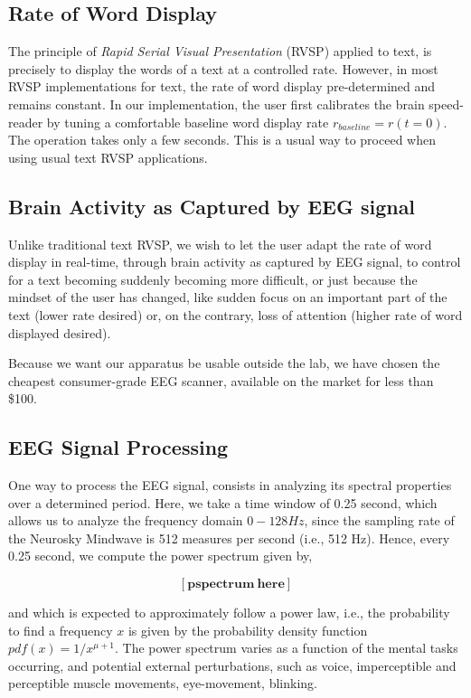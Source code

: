 \subsection{Rate of Word Display}
The principle of {\it Rapid Serial Visual Presentation} (RVSP) applied to text, is precisely to display the words of a text at a controlled rate. However, in most RVSP implementations for text, the rate of word display pre-determined and remains constant. In our implementation, the user first calibrates the brain speed-reader by tuning a comfortable baseline word display rate $r_{baseline} = r(t = 0)$. The operation takes only a few seconds. This is a usual way to proceed when using usual text RVSP applications.

\subsection{Brain Activity as Captured by EEG signal}
Unlike traditional text RVSP, we wish to let the user adapt the rate of word display in real-time, through brain activity as captured by EEG signal, to control for a text becoming suddenly becoming more difficult, or just because the mindset of the user has changed, like sudden focus on an important part of the text (lower rate desired) or, on the contrary, loss of attention (higher rate of word displayed desired).

Because we want our apparatus be usable outside the lab, we have chosen the cheapest consumer-grade EEG scanner, available on the market for less than \$100.

\subsection{EEG Signal Processing}
One way to process the EEG signal, consists in analyzing its spectral properties over a determined period. Here, we take a time window of 0.25 second, which allows us to analyze the frequency domain $0-128Hz$, since the sampling rate of the Neurosky Mindwave is 512 measures per second (i.e., 512 Hz). Hence, every 0.25 second, we compute the power spectrum given by, 

 \begin{equation}
\label{eq:pspectrum}
\mathbf{[pspectrum~here]}
\end{equation}
 
and which is expected to approximately follow a power law, i.e., the probability to find a frequency $x$ is given by the probability density function $pdf(x)  = 1/x^{\mu+1}$. The power spectrum varies as a function of the mental tasks occurring, and potential external perturbations, such as voice, imperceptible and perceptible muscle movements, eye-movement, blinking.



